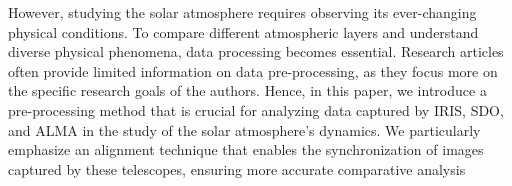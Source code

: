 \documentclass[a4paper,alpha-refs]{eSpectra}
\begin{document}
However, studying the solar atmosphere requires observing its ever-changing physical conditions. To compare different atmospheric layers and understand diverse physical phenomena, data processing becomes essential. Research articles often provide limited information on data pre-processing, as they focus more on the specific research goals of the authors. Hence, in this paper, we introduce a pre-processing method that is crucial for analyzing data captured by IRIS, SDO, and ALMA in the study of the solar atmosphere’s dynamics. We particularly emphasize an alignment technique that enables the synchronization of images captured by these telescopes, ensuring more accurate comparative analysis




\end{document}
